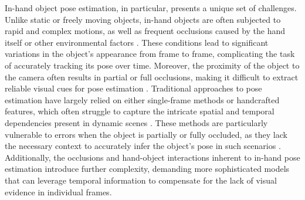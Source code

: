 In-hand object pose estimation, in particular, presents a unique set of challenges. Unlike static or freely moving objects, in-hand objects are often subjected to rapid and complex motions, as well as frequent occlusions caused by the hand itself or other environmental factors \cite{chao2021dexycb, hoang2024multi, garcia2018first, llop2022benchmarking}. These conditions lead to significant variations in the object's appearance from frame to frame, complicating the task of accurately tracking its pose over time. Moreover, the proximity of the object to the camera often results in partial or full occlusions, making it difficult to extract reliable visual cues for pose estimation \DIFdelbegin {}\DIFdelend \DIFaddbegin {}\DIFaddend . Traditional approaches to pose estimation have largely relied on either single-frame methods or handcrafted features, which often struggle to capture the intricate spatial and temporal dependencies present in dynamic scenes \cite{billings2019silhonet, peng2019pvnet}. These methods are particularly vulnerable to errors when the object is partially or fully occluded, as they lack the necessary context to accurately infer the object's pose in such scenarios \DIFdelbegin {}\DIFdelend \DIFaddbegin {}\DIFaddend . Additionally, the occlusions and hand-object interactions inherent to in-hand pose estimation introduce further complexity, demanding more sophisticated models that can leverage temporal information to compensate for the lack of visual evidence in individual frames.

